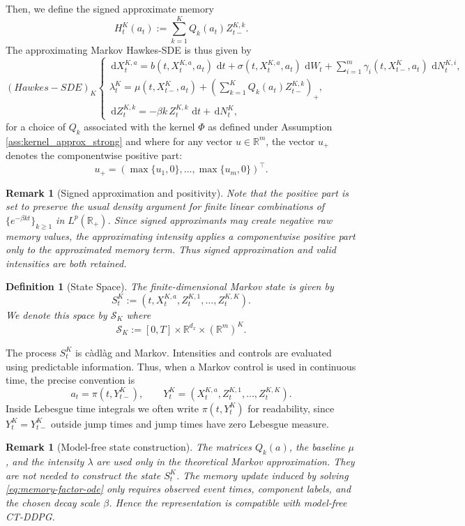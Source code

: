 \documentclass[11pt]{article}
\theoremstyle{remarkitalic}
\newtheorem{definition}[theorem]{Definition}
\theoremstyle{remarkitalic}
\newtheorem{remark}[theorem]{Remark}
\newcommand{\R}{\mathbb R}
\newcommand{\Sspace}{\mathcal S}
\newcommand{\dd}{\,\mathrm d}
\newcommand{\1}{\mathbf 1}
\begin{document}
Then, we define the signed approximate memory
\[
    H_t^K(a_t)
    :=
    \sum_{k=1}^K Q_k(a_t)Z_{t-}^{K,k}.
\] The approximating Markov Hawkes-SDE is thus given by
\[
(Hawkes-SDE)_K\begin{cases}
     \dd X_t^{K,a}
    =
    b(t,X_t^{K,a},a_t)\,\dd t
    +
    \sigma(t,X_t^{K,a},a_t)\,\dd W_t
    +
    \sum_{i=1}^m \gamma_i(t,X_{t-}^K,a_t)\,\dd N_t^{K,i},\\
    \lambda_t^K
    =
    \mu(t,X_{t-}^K,a_t)
    +
    \left(\sum_{k=1}^K Q_k(a_t)Z_{t-}^{K,k}\right)_+,\\
    \dd Z_t^{K,k}
    =
    -\beta k\,Z_t^{K,k}\,\dd t
    +
    \dd N_t^{K},
\end{cases}
\]
\noindent for a choice of $Q_k$ associated with the kernel $\Phi$
 as defined under Assumption \ref{ass:kernel_approx_strong}
 and where for any vector $u\in \mathbb R^m$, the vector $u_+$ denotes the componentwise positive part:
\[
    u_+=(\max\{u_1,0\},\dots,\max\{u_m,0\})^\top.
\]



\begin{remark}[Signed approximation and positivity]
Note that the positive part is set to preserve the usual density argument for finite linear combinations of $\{e^{-\beta kt}\}_{k\ge1}$ in $L^p(\R_+)$. Since signed approximants may create negative raw memory values, the approximating intensity applies a componentwise positive part only to the approximated memory term. Thus signed approximation and valid intensities are both retained.
\end{remark}


\begin{definition}[State Space]
    The finite-dimensional Markov state is given by 
   \[ S_t^K
    :=
    (t,X_t^{K,a},Z_t^{K,1},\dots,Z_t^{K,K}).\]
    We denote this space by $\Sspace_K$ where
\[
    \Sspace_K:=[0,T]\times\R^{d_x}\times(\R^m)^K.
\]

\end{definition} The process $S_t^K$ is c\`adl\`ag and Markov. Intensities and controls are evaluated using predictable information. Thus, when a Markov control is used in continuous time, the precise convention is
\[
    a_t=\pi(t,Y_{t-}^K),
    \qquad
    Y_t^K=(X_t^{K,a},Z_t^{K,1},\dots,Z_t^{K,K}).
\]
Inside Lebesgue time integrals we often write $\pi(t,Y_t^K)$ for readability, since $Y_t^K=Y_{t-}^K$ outside jump times and jump times have zero Lebesgue measure.


\begin{remark}[Model-free state construction]
The matrices $Q_k(a)$, the baseline $\mu$, and the intensity $\lambda$ are used only in the theoretical Markov approximation. They are not needed to construct the state $S_t^K$. The memory update induced by solving \eqref{eq:memory-factor-ode} only requires observed event times, component labels, and the chosen decay scale $\beta$. Hence the representation is compatible with model-free CT-DDPG.
\end{remark}
\end{document}

